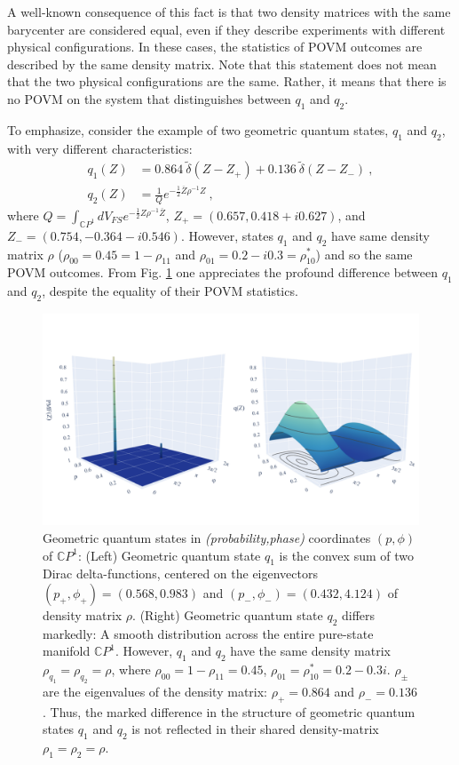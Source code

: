 \documentclass[draft,nofootinbib,pre,twocolumn,showpacs,showkeys,preprintnumbers,floatfix]{revtex4-1}
\newcommand{\1}{\mathbbm{1}}
\begin{document}
A well-known consequence of this fact is that two density matrices with the
same barycenter are considered equal, even if they describe experiments with
different physical configurations. In these cases, the statistics of POVM
outcomes are described by the same density matrix. Note that this statement
does not mean that the two physical configurations are the same. Rather, it
means that there is no POVM on the system that distinguishes between $q_1$ and
$q_2$.

To emphasize, consider the example of two geometric quantum states, $q_1$ and
$q_2$, with very different characteristics:
\begin{align*}
q_1(Z) & = 0.864~\tilde{\delta}(Z - Z_{+}) + 0.136~\tilde{\delta}(Z - Z_{-})~,\\
q_2(Z) & = \frac{1}{Q} e^{-\frac{1}{2} \overline{Z}\rho^{-1}Z } 
  ~,
\end{align*}
where $Q = \int_{\mathbb{C}P^1} dV_{FS} e^{-\frac{1}{2}Z \rho^{-1}
\overline{Z}}$, $Z_+ = (0.657,0.418 + i 0.627)$, and $Z_- =
(0.754,-0.364-i0.546)$. However, states $q_1$ and $q_2$ have same density
matrix $\rho$ ($\rho_{00} = 0.45 = 1- \rho_{11}$ and $\rho_{01} = 0.2 - i 0.3
= \rho_{10}^{*}$) and so the same POVM outcomes. From Fig. \ref{fig:Example}
one appreciates the profound difference between $q_1$ and $q_2$, despite the
equality of their POVM statistics.

\begin{figure}[h]
\centering
\includegraphics[width=\columnwidth]{img/New_Example.pdf}
\caption{Geometric quantum states in \emph{(probability,phase)} coordinates
	$(p,\phi)$ of $\mathbb{C}P^1$: (Left) Geometric quantum state $q_1$ is the
	convex sum of two Dirac delta-functions, centered on the eigenvectors
	$(p_+,\phi_+) = (0.568,0.983) $ and $(p_-, \phi_-) = (0.432,4.124)$ of
	density matrix $\rho$. (Right) Geometric quantum state $q_2$ differs
	markedly: A smooth distribution across the entire pure-state manifold
	$\mathbb{C}P^1$. However, $q_1$ and $q_2$ have the same density matrix
	$\rho_{q_1} = \rho_{q_2} = \rho$, where $\rho_{00} = 1- \rho_{11} = 0.45$,
	$\rho_{01} = \rho_{10}^{*} = 0.2 - 0.3 i$. $\rho_{\pm}$ are the eigenvalues
	of the density matrix: $\rho_+ = 0.864$ and $\rho_{-}=0.136$. Thus, the
	marked difference in the structure of geometric quantum states $q_1$ and
	$q_2$ is not reflected in their shared density-matrix $\rho_1 = \rho_2 =
	\rho$.
	}
\label{fig:Example} 
\end{figure}
\end{document}
